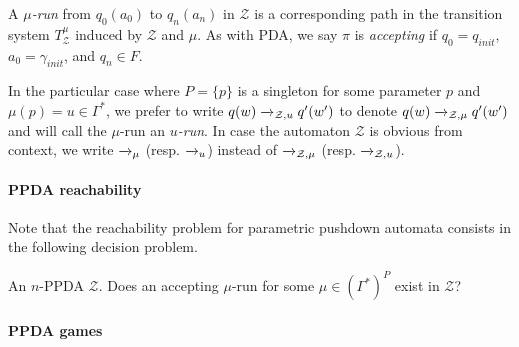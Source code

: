 A {\em $\mu$-run} from $q_0(a_0)$ to $q_n(a_n)$ in $\mathcal{Z}$ is a corresponding
path in the transition system 
$T_{\mathcal{Z}}^\mu$ 
induced by $\mathcal{Z}$ and $\mu$.
%
%
As with PDA, we say $\pi$ is {\em accepting} if $q_0 = q_{init}$, $a_0=\gamma_{init}$,
and $q_n\in F$.
%




In the particular case where $P=\{p\}$ is a singleton for some parameter $p$ and $\mu(p)=u \in \Gamma^*$,
we prefer to write $q(w)\xrightarrow{%
}_{\mathcal{Z}, u}q'(w')$
to denote $q(w)\xrightarrow{%
}_{\mathcal{Z}, \mu}q'(w')$ and
will call the $\mu$-run an {\em $u$-run}. In case the automaton $\mathcal{Z}$ is obvious from context, we write $\xrightarrow{%
}_{\mu}$ (resp. $\xrightarrow{%
}_{u}$)
instead of $\xrightarrow{%
}_{\mathcal{Z}, \mu}$ (resp. $\xrightarrow{%
}_{\mathcal{Z},u}$). \\



\paragraph{PPDA reachability}

Note that the reachability problem for parametric pushdown automata consists in
the following decision problem.

{An $n$-PPDA $\mathcal{Z}$.}
{Does 
an accepting $\mu$-run for some $\mu\in(\Gamma^*)^P$ exist in
 $\mathcal{Z}$?\newline}


\paragraph{PPDA games}

